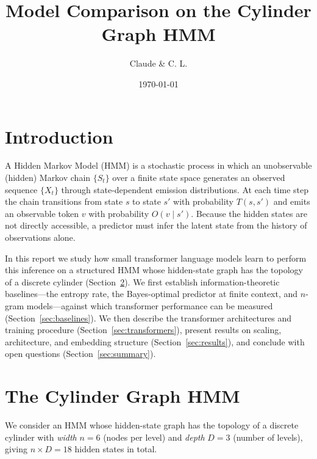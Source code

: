 \documentclass[11pt]{article}
\title{Model Comparison on the Cylinder Graph HMM}
\author{Claude \& C. L.}
\date{\today}
\begin{document}
\maketitle

\section{Introduction}

\newcommand{\lcq}[1]{\textcolor{red}{#1}}

A Hidden Markov Model (HMM) is a stochastic process in which an
unobservable (hidden) Markov chain $\{S_t\}$ over a finite state space
generates an observed sequence $\{X_t\}$ through state-dependent
emission distributions.  At each time step the chain transitions from
state $s$ to state $s'$ with probability $T(s, s')$ and emits an
observable token $v$ with probability $O(v \mid s')$.  Because the
hidden states are not directly accessible, a predictor must infer the
latent state from the history of observations alone.

In this report we study how small transformer language models learn to
perform this inference on a structured HMM whose hidden-state graph has
the topology of a discrete cylinder (Section~\ref{sec:hmm}).  We first
establish information-theoretic baselines---the entropy rate, the
Bayes-optimal predictor at finite context, and $n$-gram
models---against which transformer performance can be measured
(Section~\ref{sec:baselines}).  We then describe the transformer
architectures and training procedure (Section~\ref{sec:transformers}),
present results on scaling, architecture, and embedding structure
(Section~\ref{sec:results}), and conclude with open questions
(Section~\ref{sec:summary}).

\section{The Cylinder Graph HMM}\label{sec:hmm}

We consider an HMM whose hidden-state graph has the topology of a
discrete cylinder with \emph{width} $n = 6$ (nodes per level) and
\emph{depth} $D = 3$ (number of levels), giving
$n \times D = 18$ hidden states in total.
\end{document}
